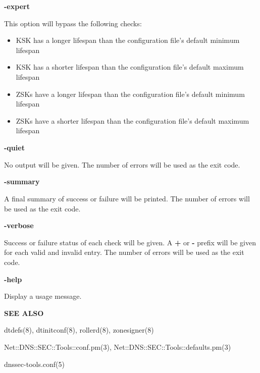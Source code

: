 \begin{description}

\item {\bf -expert}\verb" "

This option will bypass the following checks:

\begin{itemize}

\item KSK has a longer lifespan than the configuration file's default minimum
lifespan

\item KSK has a shorter lifespan than the configuration file's default maximum
lifespan

\item ZSKs have a longer lifespan than the configuration file's default
minimum lifespan

\item ZSKs have a shorter lifespan than the configuration file's default
maximum lifespan

\end{itemize}

\item {\bf -quiet}\verb" "

No output will be given.
The number of errors will be used as the exit code.

\item {\bf -summary}\verb" "

A final summary of success or failure will be printed.
The number of errors will be used as the exit code.

\item {\bf -verbose}\verb" "

Success or failure status of each check will be given.
A {\bf +} or {\bf -} prefix will be given for each valid and invalid entry.
The number of errors will be used as the exit code.

\item {\bf -help}\verb" "

Display a usage message.

\end{description}

{\bf SEE ALSO}

dtdefs(8),
dtinitconf(8),
rollerd(8),
zonesigner(8)

Net::DNS::SEC::Tools::conf.pm(3),
Net::DNS::SEC::Tools::defaults.pm(3)

dnssec-tools.conf(5)

